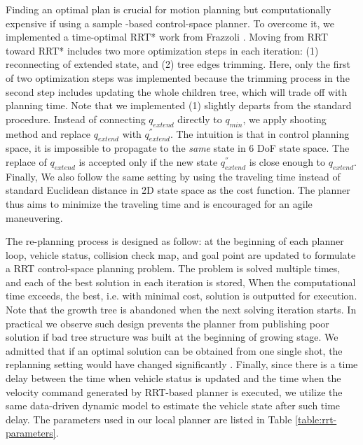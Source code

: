 \documentclass[../thesis.tex]{subfiles}
\begin{document}
Finding an optimal plan is crucial for motion planning but computationally expensive if using a sample -based control-space planner. To overcome it, we implemented a time-optimal RRT* work from Frazzoli \cite{hwan2011anytime}. Moving from RRT toward RRT* includes two more optimization steps in each iteration: (1) reconnecting of extended state, and (2) tree edges trimming. Here, only the first of two optimization steps was implemented because the trimming process in the second step includes updating the whole children tree, which will trade off with planning time. Note that we implemented (1) slightly departs from the standard procedure. Instead of connecting $q_{extend}$ directly to $q_{min}$, we apply shooting method and replace $q_{extend}$ with $q^{''}_{extend}$. The intuition is that in control planning space, it is impossible to propagate to the \textit{same} state in 6 DoF state space. The replace of $q_{extend}$ is accepted only if the new state $q^{''}_{extend}$ is close enough to $q_{extend}$. Finally, We also follow the same setting by using the traveling time instead of standard Euclidean distance in 2D state space as the cost function. The planner thus aims to minimize the traveling time and is encouraged for an agile maneuvering.

The re-planning process is designed as follow: at the beginning of each planner loop, vehicle status, collision check map, and goal point are updated to formulate a RRT control-space planning problem. The problem is solved multiple times, and each of the best solution in each iteration is stored, When the computational time exceeds, the best, i.e. with minimal cost, solution is outputted for execution. Note that the growth tree is abandoned when the next solving iteration starts. In practical we observe such design prevents the planner from publishing poor solution if bad tree structure was built at the beginning of growing stage. We admitted that if an optimal solution can be obtained from one single shot, the replanning setting would have changed significantly \cite{ferguson2006replanning}. Finally, since there is a time delay between the time when vehicle status is updated and the time when the velocity command generated by RRT-based planner is executed, we utilize the same data-driven dynamic model to estimate the vehicle state after such time delay. The parameters used in our local planner are listed in Table \ref{table:rrt-parameters}. 
\end{document}
